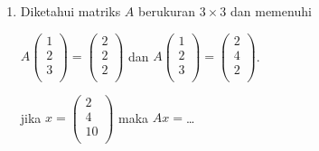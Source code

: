 \documentclass[A4,12PT, english, twocolumn]{journal}
\begin{document}
\begin{enumerate}
\item Diketahui matriks $A$ berukuran $3\times 3$ dan memenuhi
\begin{center}
    $
    A\begin{pmatrix}
        1\\
        2\\
        3\\
    \end{pmatrix}=
    \begin{pmatrix}
        2\\
        2\\
        2\\
    \end{pmatrix}
    $ dan
    $
    A\begin{pmatrix}
        1\\
        2\\
        3\\
    \end{pmatrix}=
    \begin{pmatrix}
        2\\
        4\\
        2\\
    \end{pmatrix}
    $.
\end{center}
jika $x=\begin{pmatrix}
            2\\
            4\\
            10\\
        \end{pmatrix}$ maka $Ax=$\dots
\end{enumerate}
\end{document}
